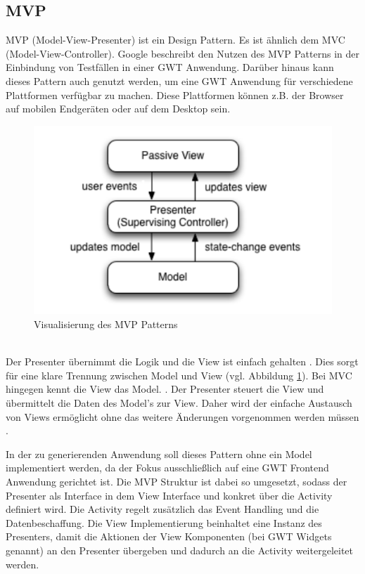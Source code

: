 \subsection{MVP}
\label{MVP}
MVP (Model-View-Presenter) ist ein Design Pattern. Es ist ähnlich dem MVC
(Model-View-Controller). Google beschreibt den Nutzen des MVP Patterns in der
Einbindung von Testfällen in einer GWT Anwendung. Darüber hinaus kann dieses
Pattern auch genutzt werden, um eine GWT Anwendung für verschiedene Plattformen
verfügbar zu machen. Diese Plattformen können z.B. der Browser auf mobilen
Endgeräten oder auf dem Desktop sein.
\begin{figure}[htbp]
\begin{center}
\includegraphics{./img/MVP.pdf}
\caption{Visualisierung des MVP Patterns \cite{bib:MVP1}}\label{Fig:MVP}
\end{center}
\end{figure}\\
Der Presenter übernimmt die Logik und die View ist einfach gehalten
\cite{bib:MVP2}. Dies sorgt für eine klare Trennung zwischen Model und View (vgl.
Abbildung \ref{Fig:MVP}). Bei MVC hingegen kennt die View das Model.
\cite{bib:MVCvsMVP}. Der Presenter steuert die View und übermittelt die Daten
des Model's zur View.
Daher wird der einfache Austausch von Views ermöglicht ohne das weitere
Änderungen vorgenommen werden müssen \cite{bib:MVP1}\cite{bib:MVP2}.

In der zu generierenden Anwendung soll dieses Pattern ohne ein Model
implementiert werden, da der Fokus ausschließlich auf eine GWT Frontend
Anwendung gerichtet ist. Die MVP Struktur ist dabei so umgesetzt, sodass der
Presenter als Interface in dem View Interface und konkret über die Activity
definiert wird. Die Activity regelt zusätzlich das Event Handling und die
Datenbeschaffung. Die View Implementierung beinhaltet eine
Instanz des Presenters, damit die Aktionen der View Komponenten
(bei GWT Widgets genannt) an den Presenter übergeben und dadurch an die
Activity weitergeleitet werden.
